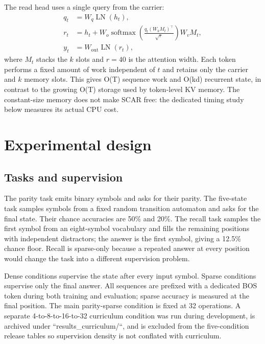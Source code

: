\documentclass{article}
\begin{document}
The read head uses a single query from the carrier:
\begin{align}
q_t &= W_q\operatorname{LN}(h_t),\\
r_t &= h_t + W_o\operatorname{softmax}\!\left(
\frac{q_t(W_kM_t)^\top}{\sqrt{r}}\right)W_vM_t,\\
y_t &= W_{\mathrm{out}}\operatorname{LN}(r_t),
\end{align}
where $M_t$ stacks the $k$ slots and $r=40$ is the attention width. Each
token performs a fixed amount of work independent of $t$ and retains only the
carrier and $k$ memory slots. This gives O(T) sequence work and O(kd) recurrent
state, in contrast to the growing O(T) storage used by token-level KV memory.
The constant-size memory does not make SCAR free: the dedicated timing study
below measures its actual CPU cost.

\section{Experimental design}
\subsection{Tasks and supervision}
The parity task emits binary symbols and asks for their parity. The five-state
task samples symbols from a fixed random transition automaton and asks for the
final state. Their chance accuracies are 50\% and 20\%. The recall task samples
the first symbol from an eight-symbol vocabulary and fills the remaining
positions with independent distractors; the answer is the first symbol, giving
a 12.5\% chance floor. Recall is sparse-only because a repeated answer at every
position would change the task into a different supervision problem.

Dense conditions supervise the state after every input symbol. Sparse
conditions supervise only the final answer. All sequences are prefixed with a
dedicated BOS token during both training and evaluation; sparse accuracy is
measured at the final position. The main parity-sparse condition is fixed at
32 operations. A separate 4-to-8-to-16-to-32 curriculum condition was run
during development, is archived under ``results\_curriculum/``, and is
excluded from the five-condition release tables so supervision density is not
conflated with curriculum.
\end{document}
